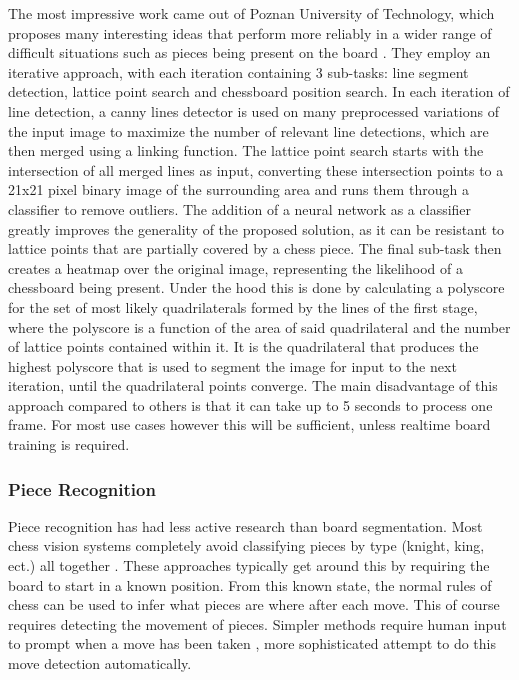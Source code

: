 The most impressive work came out of Poznan University of Technology, which proposes many interesting ideas that perform more
reliably in a wider range of difficult situations such as pieces being present on the board \cite{}.  They employ an iterative
approach, with each iteration containing 3 sub-tasks: line segment detection, lattice point search and chessboard position search.
In each iteration of line detection, a canny lines detector \cite{} is used on many preprocessed variations of the input image
to maximize the number of relevant line detections, which are then merged using a linking function. The lattice point search starts with
the intersection of all merged lines as input, converting these intersection points to a 21x21 pixel binary image of the surrounding area and
runs them through a classifier to remove outliers.  The addition of a neural network as a classifier greatly improves
the generality of the proposed solution, as it can be resistant to lattice points that are partially covered by a chess piece.
The final sub-task then creates a heatmap over the original image, representing the likelihood of a chessboard being present.
Under the hood this is done by calculating a polyscore for the set of most likely quadrilaterals formed by the lines of the first stage,
where the polyscore is a function of the area of said quadrilateral and the number of lattice points contained within it.
It is the quadrilateral that produces the highest polyscore that is used to segment the image for input to the next iteration, until the quadrilateral
points converge.  The main disadvantage of this approach compared to others is that it can take up to 5 seconds to process one frame.
For most use cases however this will be sufficient, unless realtime board training is required.

\subsubsection{Piece Recognition}

Piece recognition has had less active research than board segmentation.  Most chess vision systems completely avoid classifying pieces by
type (knight, king, ect.) all together \cite{}.  These approaches typically get around this by requiring the board to start in a known position.
From this known state, the normal rules of chess can be used to infer what pieces are where after each move.  This of course requires detecting 
the movement of pieces.  Simpler methods
require human input to prompt when a move has been taken \cite{}, more sophisticated attempt to do this move detection automatically.

